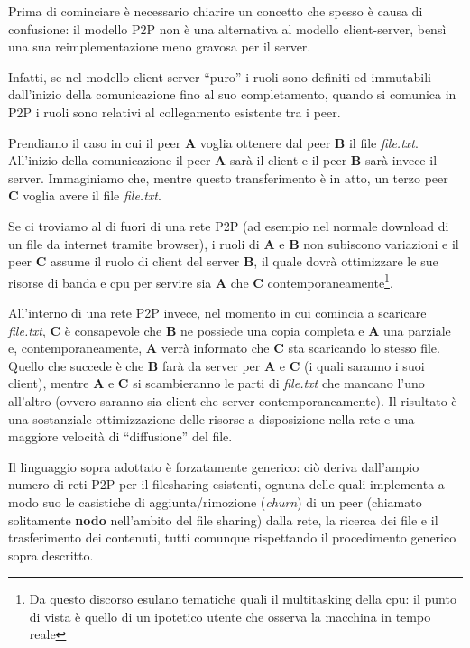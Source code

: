 Prima di cominciare è necessario chiarire un concetto che spesso è causa di confusione: il modello P2P non è una alternativa al modello client-server, bensì una sua reimplementazione meno gravosa per il server.

Infatti, se nel modello client-server ``puro'' i ruoli sono definiti ed immutabili dall'inizio della comunicazione fino al suo completamento, quando si comunica in P2P i ruoli sono relativi al collegamento esistente tra i peer.

Prendiamo il caso in cui il peer \textbf{A} voglia ottenere dal peer \textbf{B} il file \emph{file.txt}. All'inizio della comunicazione il peer \textbf{A} sarà il client e il peer \textbf{B} sarà invece il server. Immaginiamo che, mentre questo transferimento è in atto, un terzo peer \textbf{C} voglia avere il file \emph{file.txt}.

Se ci troviamo al di fuori di una rete P2P (ad esempio nel normale download di un file da internet tramite browser), i ruoli di \textbf{A} e \textbf{B} non subiscono variazioni e il peer \textbf{C} assume il ruolo di client del server \textbf{B}, il quale dovrà ottimizzare le sue risorse di banda e cpu per servire sia \textbf{A} che \textbf{C} contemporaneamente\footnote{Da questo discorso esulano tematiche quali il multitasking della cpu: il punto di vista è quello di un ipotetico utente che osserva la macchina in tempo reale}.

All'interno di una rete P2P invece, nel momento in cui comincia a scaricare \emph{file.txt}, \textbf{C} è consapevole che \textbf{B} ne possiede una copia completa e \textbf{A} una parziale e, contemporaneamente, \textbf{A} verrà informato che \textbf{C} sta scaricando lo stesso file. Quello che succede è che \textbf{B} farà da server per \textbf{A} e \textbf{C} (i quali saranno i suoi client), mentre \textbf{A} e \textbf{C} si scambieranno le parti di \emph{file.txt} che mancano l'uno all'altro (ovvero saranno sia client che server contemporaneamente). Il risultato è una sostanziale ottimizzazione delle risorse a disposizione nella rete e una maggiore velocità di ``diffusione'' del file.

Il linguaggio sopra adottato è forzatamente generico: ciò deriva dall'ampio numero di reti P2P per il filesharing esistenti, ognuna delle quali implementa a modo suo le casistiche di aggiunta/rimozione (\emph{churn}) di un peer (chiamato solitamente \textbf{nodo} nell'ambito del file sharing) dalla rete, la ricerca dei file e il trasferimento dei contenuti, tutti comunque rispettando il procedimento generico sopra descritto.

